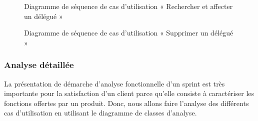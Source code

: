 \begin{figure}[H]
  \centering
  \caption{Diagramme de séquence de cas d'utilisation « Rechercher et affecter un délégué »}
  \label{fig:sequence_search_affect_delegation}
\end{figure}

\begin{figure}[H]
  \centering
  \caption{Diagramme de séquence de cas d'utilisation « Supprimer un délégué »}
  \label{fig:sequence_annulation_delegation}
\end{figure}




\subsubsection{Analyse détaillée}
La présentation de démarche d'analyse fonctionnelle d'un sprint est très importante pour la satisfaction d'un client parce qu'elle consiste à caractériser les fonctions offertes par un produit.
Donc, nous allons faire l'analyse des différents cas d'utilisation en utilisant le diagramme de classes d'analyse.


